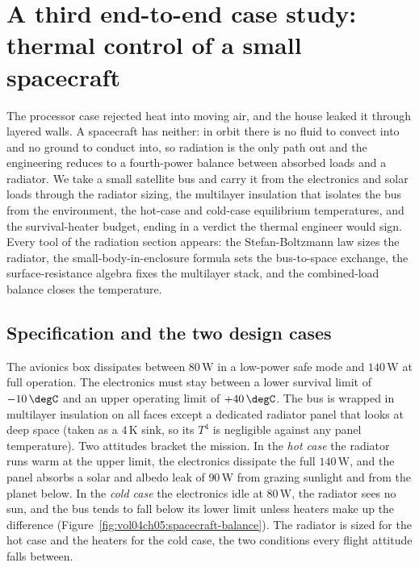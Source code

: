 \section{A third end-to-end case study: thermal control of a small
spacecraft}

The processor case rejected heat into moving air, and the house leaked it
through layered walls. A spacecraft has neither: in orbit there is no
fluid to convect into and no ground to conduct into, so radiation is the
only path out and the engineering reduces to a fourth-power balance
between absorbed loads and a radiator. We take a small satellite bus and
carry it from the electronics and solar loads through the radiator sizing,
the multilayer insulation that isolates the bus from the environment, the
hot-case and cold-case equilibrium temperatures, and the survival-heater
budget, ending in a verdict the thermal engineer would sign. Every tool of
the radiation section appears: the Stefan-Boltzmann law sizes the
radiator, the small-body-in-enclosure formula sets the bus-to-space
exchange, the surface-resistance algebra fixes the multilayer stack, and
the combined-load balance closes the temperature.

\subsection{Specification and the two design cases}

The avionics box dissipates between $80\,\text{W}$ in a low-power safe
mode and $140\,\text{W}$ at full operation. The electronics must stay
between a lower survival limit of $-10\,\degC$ and an upper operating
limit of $+40\,\degC$. The bus is wrapped in multilayer insulation on all
faces except a dedicated radiator panel that looks at deep space (taken as
a $4\,\si{\kelvin}$ sink, so its $T^4$ is negligible against any panel
temperature). Two attitudes bracket the mission. In the \emph{hot case}
the radiator runs warm at the upper limit, the electronics dissipate the
full $140\,\text{W}$, and the panel absorbs a solar and albedo leak of
$90\,\text{W}$ from grazing sunlight and from the planet below. In the
\emph{cold case} the electronics idle at $80\,\text{W}$, the radiator
sees no sun, and the bus tends to fall below its lower limit unless
heaters make up the difference (Figure~\ref{fig:vol04ch05:spacecraft-balance}).
The radiator is sized for the hot case and the heaters for the cold case,
the two conditions every flight attitude falls between.

